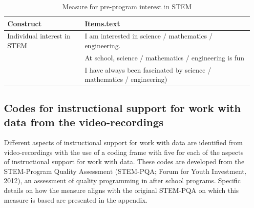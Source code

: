 \documentclass[]{msu-thesis}
\theoremstyle{definition}
\theoremstyle{definition}
\theoremstyle{definition}
\theoremstyle{remark}
\begin{document}
\begin{table}

\caption{\label{tab:unnamed-chunk-6}Measure for pre-program interest in STEM}
\centering
\begin{tabular}[t]{ll}
\toprule
Construct & Items.text\\
\midrule
Individual interest in STEM & I am interested in science / mathematics / engineering.\\
 & At school, science / mathematics / engineering is fun\\
 & I have always been fascinated by science / mathematics / engineering)\\
\bottomrule
\end{tabular}
\end{table}

\subsection{Codes for instructional support for work with data from the
video-recordings}\label{codes-for-instructional-support-for-work-with-data-from-the-video-recordings}

Different aspects of instructional support for work with data are
identified from video-recordings with the use of a coding frame with
five for each of the aspects of instructional support for work with
data. These codes are developed from the STEM-Program Quality Assessment
(STEM-PQA; Forum for Youth Investment, 2012), an assessment of quality
programming in after school programs. Specific details on how the
measure aligns with the original STEM-PQA on which this measure is based
are presented in the appendix.

\begin{table}

\caption{\label{tab:unnamed-chunk-7}Coding Frame for Instructional Support for Work With Data}
\centering
{}
\end{table}
\end{document}
